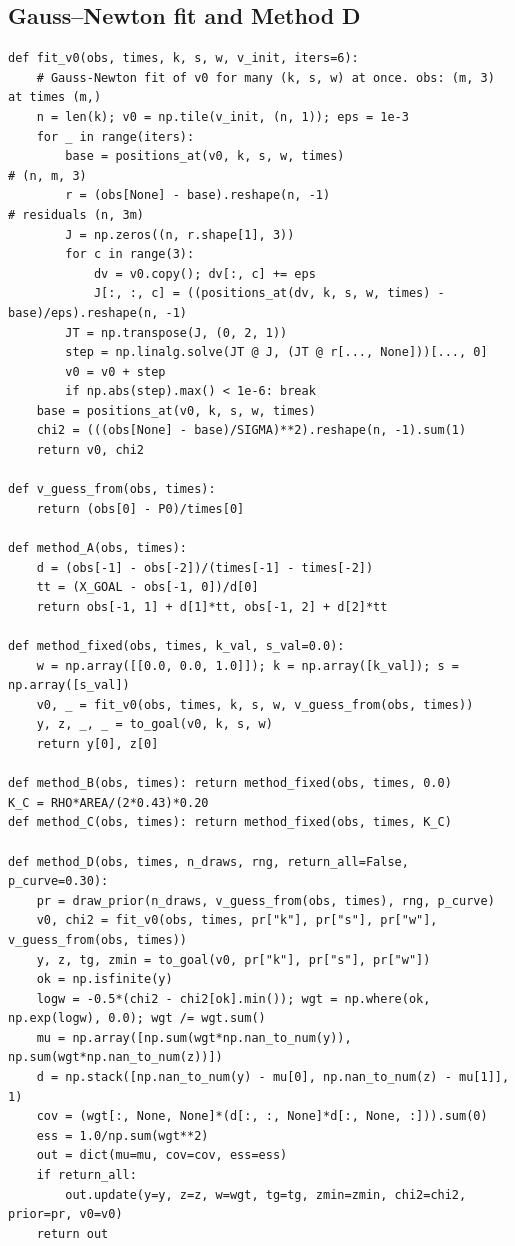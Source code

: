 \subsection*{Gauss--Newton fit and Method D}
\begin{lstlisting}[style=mypython,basicstyle=\ttfamily\scriptsize]
def fit_v0(obs, times, k, s, w, v_init, iters=6):
    # Gauss-Newton fit of v0 for many (k, s, w) at once. obs: (m, 3) at times (m,)
    n = len(k); v0 = np.tile(v_init, (n, 1)); eps = 1e-3
    for _ in range(iters):
        base = positions_at(v0, k, s, w, times)                       # (n, m, 3)
        r = (obs[None] - base).reshape(n, -1)                          # residuals (n, 3m)
        J = np.zeros((n, r.shape[1], 3))
        for c in range(3):
            dv = v0.copy(); dv[:, c] += eps
            J[:, :, c] = ((positions_at(dv, k, s, w, times) - base)/eps).reshape(n, -1)
        JT = np.transpose(J, (0, 2, 1))
        step = np.linalg.solve(JT @ J, (JT @ r[..., None]))[..., 0]
        v0 = v0 + step
        if np.abs(step).max() < 1e-6: break
    base = positions_at(v0, k, s, w, times)
    chi2 = (((obs[None] - base)/SIGMA)**2).reshape(n, -1).sum(1)
    return v0, chi2

def v_guess_from(obs, times):
    return (obs[0] - P0)/times[0]

def method_A(obs, times):
    d = (obs[-1] - obs[-2])/(times[-1] - times[-2])
    tt = (X_GOAL - obs[-1, 0])/d[0]
    return obs[-1, 1] + d[1]*tt, obs[-1, 2] + d[2]*tt

def method_fixed(obs, times, k_val, s_val=0.0):
    w = np.array([[0.0, 0.0, 1.0]]); k = np.array([k_val]); s = np.array([s_val])
    v0, _ = fit_v0(obs, times, k, s, w, v_guess_from(obs, times))
    y, z, _, _ = to_goal(v0, k, s, w)
    return y[0], z[0]

def method_B(obs, times): return method_fixed(obs, times, 0.0)
K_C = RHO*AREA/(2*0.43)*0.20
def method_C(obs, times): return method_fixed(obs, times, K_C)

def method_D(obs, times, n_draws, rng, return_all=False, p_curve=0.30):
    pr = draw_prior(n_draws, v_guess_from(obs, times), rng, p_curve)
    v0, chi2 = fit_v0(obs, times, pr["k"], pr["s"], pr["w"], v_guess_from(obs, times))
    y, z, tg, zmin = to_goal(v0, pr["k"], pr["s"], pr["w"])
    ok = np.isfinite(y)
    logw = -0.5*(chi2 - chi2[ok].min()); wgt = np.where(ok, np.exp(logw), 0.0); wgt /= wgt.sum()
    mu = np.array([np.sum(wgt*np.nan_to_num(y)), np.sum(wgt*np.nan_to_num(z))])
    d = np.stack([np.nan_to_num(y) - mu[0], np.nan_to_num(z) - mu[1]], 1)
    cov = (wgt[:, None, None]*(d[:, :, None]*d[:, None, :])).sum(0)
    ess = 1.0/np.sum(wgt**2)
    out = dict(mu=mu, cov=cov, ess=ess)
    if return_all:
        out.update(y=y, z=z, w=wgt, tg=tg, zmin=zmin, chi2=chi2, prior=pr, v0=v0)
    return out
\end{lstlisting}
